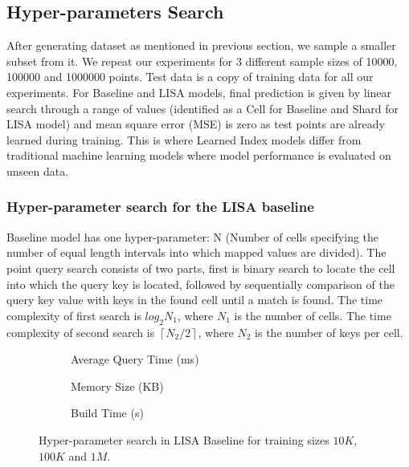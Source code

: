 \subsection{Hyper-parameters Search}

After generating dataset as mentioned in previous section, we sample a smaller subset from it. We repeat our experiments for $3$ different sample sizes of 10000, 100000 and 1000000 points. Test data is a copy of training data for all our experiments. For Baseline and LISA models, final prediction is given by linear search through a range of values (identified as a Cell for Baseline and Shard for LISA model) and mean square error (MSE) is zero as test points are already learned during training. This is where Learned Index models differ from traditional machine learning models where model performance is evaluated on unseen data. 

\subsubsection {Hyper-parameter search for the LISA baseline}
Baseline model has one hyper-parameter: N (Number of cells specifying the number of equal length intervals into which mapped values are divided). The point query search consists of two parts, first is binary search to locate the cell into which the query key is located, followed by sequentially comparison of the query key value with keys in the found cell until a match is found. The time complexity of first search is $log_{2}N_{1}$, where $N_{1}$ is the number of cells. The time complexity of second search is  $ \left \lceil {N_{2} / 2}\right \rceil $, where $N_{2}$ is the number of keys per cell.  

\begin{figure}
 \centering
     \begin{subfigure}[b]{0.32\textwidth}
         \centering
         
         \caption{Average Query Time (ms)}
         \label{fig:2d_exp3_1_1}
     \end{subfigure}
     \hfill
     \begin{subfigure}[b]{0.32\textwidth}
         \centering
         
         \caption{Memory Size (KB)}
         \label{fig:2d_exp3_1_2}
     \end{subfigure}
     \hfill
     \begin{subfigure}[b]{0.32\textwidth}
         \centering
         
         \caption{Build Time (s)}
         \label{fig:2d_exp3_1_3}
     \end{subfigure}
     \hfill
     \caption{Hyper-parameter search in LISA Baseline for training sizes $10K$, $100K$ and $1M$.}
     \label{fig:LISA_Baseline_Hyperparameter_Search}
\end{figure}


